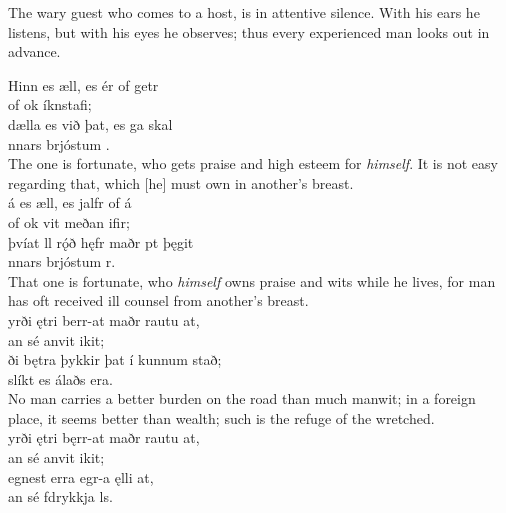 \bvb The wary guest who comes to a host, is in attentive silence\footnotemark[13]. With his ears he listens, but with his eyes he observes; thus every experienced man looks out in advance. \\

\bva Hinn es æll, \hld es ér of getr \\%
\ind {}of ok íknstafi; \\%
dælla es við þat, \hld es ga skal \\%
\ind {}nnars brjóstum .\\%

\bvb The one is fortunate, who gets praise and high esteem for \emph{himself}. It is not easy regarding that, which [he] must own in another's breast. \\

\bva {}á es æll, \hld es jalfr of á \\%
\ind {}of ok vit meðan ifir; \\%
þvíat ll rǫ́ð \hld hęfr maðr pt þęgit \\%
\ind {}nnars brjóstum r.\\%

\bvb That one is fortunate, who \emph{himself} owns praise and wits while he lives, for man has oft received ill counsel from another's breast. \\

\bva {}yrði ętri \hld berr-at maðr rautu at, \\%
\ind an sé anvit ikit; \\%
ði bętra \hld þykkir þat í kunnum stað; \\%
\ind slíkt es álaðs era.\\%

\bvb No man carries a better burden on the road than much manwit; in a foreign place, it seems better than wealth; such is the refuge of the wretched. \\

\bva {}yrði ętri \hld bęrr-at maðr rautu at, \\%
\ind an sé anvit ikit; \\%
egnest erra \hld {}egr-a ęlli at, \\%
\ind an sé fdrykkja ls.\\%

